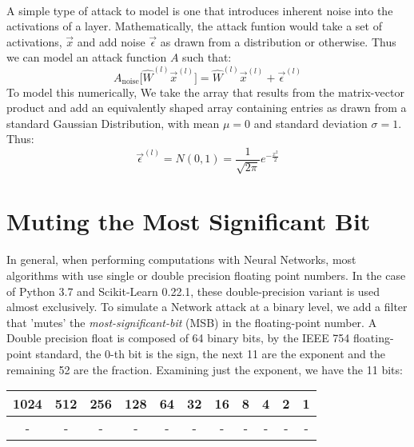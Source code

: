 \documentclass[12pt,letterpaper]{article}
\begin{document}
\paragraph*{}A simple type of attack to model is one that introduces inherent noise into the activations of a layer. Mathematically, the attack funtion would take a set of activations, $\vec{x}$ and add noise $\vec{\epsilon}$ as drawn from a distribution or otherwise. Thus we can model an attack function $A$ such that:
\begin{equation}
\label{noise attack}
A_{\text{noise}} \big[ \hat{W}^{(l)} \vec{x}^{(l)} \big] = \hat{W}^{(l)} \vec{x}^{(l)} + \vec{\epsilon}^{(l)}
\end{equation}
To model this numerically, We take the array that results from the matrix-vector product and add an equivalently shaped array containing entries as drawn from a standard Gaussian Distribution, with mean $\mu = 0$ and standard deviation $\sigma = 1$. Thus:
\begin{equation}
\vec{\epsilon}^{(l)} = N(0,1) = \frac{1}{\sqrt{2\pi}} e^{-\frac{x^2}{2}}
\end{equation}



\section*{Muting the Most Significant Bit}

\paragraph*{}In general, when performing computations with Neural Networks, most algorithms with use single or double precision floating point numbers.  In the case of Python 3.7 and Scikit-Learn 0.22.1, these double-precision variant is used almost exclusively. To simulate a Network attack at a binary level, we add a filter that 'mutes' the \textit{most-significant-bit} (MSB) in the floating-point number. A Double precision float is composed of 64 binary bits, by the IEEE 754 floating-point standard, the 0-th bit is the sign, the next 11 are the exponent and the remaining 52 are the fraction. Examining just the exponent, we have the 11 bits:

\begin{center}
\begin{tabular}{|c|c|c|c|c|c|c|c|c|c|c|}
\hline
1024 & 512 & 256 & 128 & 64 & 32 & 16 & 8 & 4 & 2 & 1 \\ \hline
- & - & - & - & - & - & - & - & - & - & -  \\ \hline
\end{tabular}
\end{center}
\end{document}

